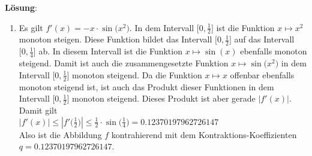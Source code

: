 \documentclass{article}
\newcommand{\solution}{\vspace*{0.2cm}

\noindent
\textbf{L\"osung}: }
\begin{document}
\solution
\begin{enumerate}
\item Es gilt $f'(x) = - x \cdot\sin\bigl(x^2)$.  In dem Intervall $\bigl[0, \frac{1}{2}\bigr]$
      ist die Funktion $x \mapsto x^2$ monoton steigen.  Diese Funktion bildet das Intervall  
      $\bigl[0, \frac{1}{2}\bigr]$ auf das Intervall $\bigl[0, \frac{1}{4}\bigr]$ ab.  In diesem
      Intervall ist die Funktion $x \mapsto \sin(x)$ ebenfalls monoton steigend.  Damit ist auch die
      zusammengesetzte Funktion $x \mapsto \sin\bigl(x^2)$ in dem Intervall $\bigl[0, \frac{1}{2}\bigr]$
      monoton steigend.   Da die Funktion $x \mapsto x$ offenbar ebenfalls monoton steigend ist,
      ist auch das Produkt dieser Funktionen in dem Intervall $\bigl[0, \frac{1}{2}\bigr]$ 
      monoton steigend.  Dieses Produkt ist aber gerade $|f'(x)|$.  Damit gilt
      \\[0.2cm]
      \hspace*{1.3cm}
      $|f'(x)| \leq |f'\bigl(\frac{1}{2}\bigr)| \leq \frac{1}{2} \cdot\sin\bigl(\frac{1}{4}\bigr) = 0.12370197962726147$
      \\[0.2cm]
      Also ist die Abbildung $f$ kontrahierend mit dem Kontraktions-Koeffizienten
      \\[0.2cm]
      \hspace*{1.3cm}
      $q = 0.12370197962726147$.
\pagebreak


\end{enumerate}
\end{document}
